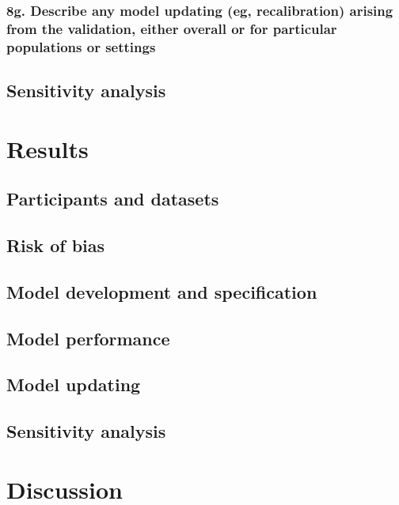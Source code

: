 \documentclass[
  letterpaper,
  DIV=11,
  numbers=noendperiod]{scrartcl}
\begin{document}
\subsubsection{8g. Describe any model updating (eg, recalibration)
arising from the validation, either overall or for particular
populations or
settings}\label{g.-describe-any-model-updating-eg-recalibration-arising-from-the-validation-either-overall-or-for-particular-populations-or-settings}

\subsection{Sensitivity analysis}\label{sensitivity-analysis}

\section{Results}\label{results}

\subsection{Participants and datasets}\label{participants-and-datasets}

\subsection{Risk of bias}\label{risk-of-bias}

\subsection{Model development and
specification}\label{model-development-and-specification}

\subsection{Model performance}\label{model-performance}

\subsection{Model updating}\label{model-updating}

\subsection{Sensitivity analysis}\label{sensitivity-analysis-1}

\section{Discussion}\label{discussion}
\end{document}
